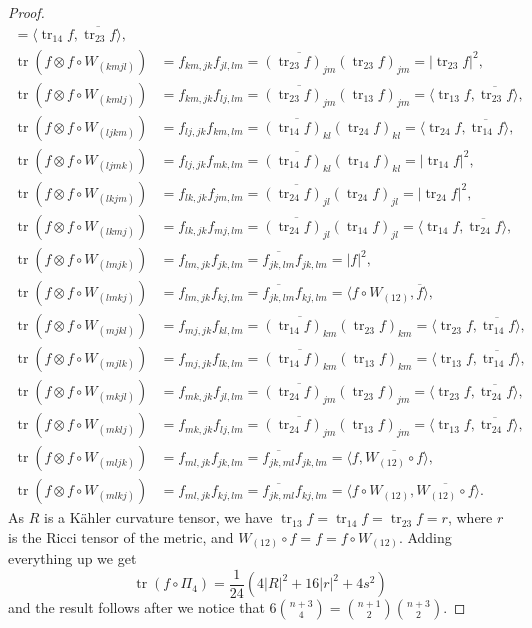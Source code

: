 \documentclass[10pt,a4paper]{amsart}
\theoremstyle{definition}
\def\ov#1{\overline{#1}}
\DeclareMathOperator{\tr}{tr}
\begin{document}
\begin{proof}
\begin{align*}
= \langle \tr_{14} f, \ov{\tr_{23} f} \rangle,
\\
\tr(f \otimes f \circ W_{(kmjl)})
&= f_{km,jk} f_{jl,lm}
= \ov{(\tr_{23} f)_{jm}} (\tr_{23} f)_{jm}
= |\! \tr_{23} f|^2,
\\
\tr(f \otimes f \circ W_{(kmlj)})
&= f_{km,jk} f_{lj,lm}
= \ov{(\tr_{23} f)_{jm}} (\tr_{13} f)_{jm}
= \langle \tr_{13} f, \ov{\tr_{23} f} \rangle,
\\
\tr(f \otimes f \circ W_{(ljkm)})
&= f_{lj,jk} f_{km,lm}
= \ov{(\tr_{14} f)_{kl}} (\tr_{24} f)_{kl}
= \langle \tr_{24} f, \ov{\tr_{14} f} \rangle,
\\
\tr(f \otimes f \circ W_{(ljmk)})
&= f_{lj,jk} f_{mk,lm}
= \ov{(\tr_{14} f)_{kl}} (\tr_{14} f)_{kl}
= |\! \tr_{14} f|^2,
\\
\tr(f \otimes f \circ W_{(lkjm)})
&= f_{lk,jk} f_{jm,lm}
= \ov{(\tr_{24} f)_{jl}} (\tr_{24} f)_{jl}
= |\! \tr_{24} f|^2,
\\
\tr(f \otimes f \circ W_{(lkmj)})
&= f_{lk,jk} f_{mj,lm}
= \ov{(\tr_{24} f)_{jl}} (\tr_{14} f)_{jl}
= \langle \tr_{14} f, \ov{\tr_{24} f} \rangle,
\\
\tr(f \otimes f \circ W_{(lmjk)})
&= f_{lm,jk} f_{jk,lm}
= \ov{f_{jk,lm}} f_{jk,lm}
= |f|^2,
\\
\tr(f \otimes f \circ W_{(lmkj)})
&= f_{lm,jk} f_{kj,lm}
= \ov{f_{jk,lm}} f_{kj,lm}
= \langle f \circ W_{(12)}, \ov f \rangle ,
\\
\tr(f \otimes f \circ W_{(mjkl)})
&= f_{mj,jk} f_{kl,lm}
= \ov{(\tr_{14} f)_{km}} (\tr_{23} f)_{km}
= \langle \tr_{23} f, \ov{\tr_{14} f} \rangle,
\\
\tr(f \otimes f \circ W_{(mjlk)})
&= f_{mj,jk} f_{lk,lm}
= \ov{(\tr_{14} f)_{km}} (\tr_{13} f)_{km}
= \langle \tr_{13} f, \ov{\tr_{14} f} \rangle,
\\
\tr(f \otimes f \circ W_{(mkjl)})
&= f_{mk,jk} f_{jl,lm}
= \ov{(\tr_{24} f)_{jm}} (\tr_{23} f)_{jm}
= \langle \tr_{23} f, \ov{\tr_{24} f} \rangle,
\\
\tr(f \otimes f \circ W_{(mklj)})
&= f_{mk,jk} f_{lj,lm}
= \ov{(\tr_{24} f)_{jm}} (\tr_{13} f)_{jm}
= \langle \tr_{13} f, \ov{\tr_{24} f} \rangle,
\\
\tr(f \otimes f \circ W_{(mljk)})
&= f_{ml,jk} f_{jk,lm}
= \ov{f_{jk,ml}} f_{jk,lm}
= \langle f, \ov{W_{(12)} \circ f} \rangle,
\\
\tr(f \otimes f \circ W_{(mlkj)})
&= f_{ml,jk} f_{kj,lm}
= \ov{f_{jk,ml}} f_{kj,lm}
= \langle f \circ W_{(12)}, \ov{W_{(12)} \circ f} \rangle.
\end{align*}
As $R$ is a K\"ahler curvature tensor, we have $\tr_{13} f = \tr_{14} f =
\tr_{23} f = r$,
where $r$ is
the Ricci tensor of the metric, and $W_{(12)} \circ f = f = f \circ W_{(12)}$.
Adding everything up we get
$$
\tr(f \circ \Pi_4)
= \frac{1}{24} (4|R|^2 + 16 |r|^2 + 4 s^2)
$$
and the result follows after we notice that
\(
6 \binom{n+3}{4} = \binom{n+1}{2} \binom{n+3}{2}
\).
\end{proof}
\end{document}
